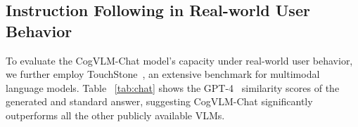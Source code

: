\subsection{Instruction Following in Real-world User Behavior}
To evaluate the CogVLM-Chat model’s capacity under real-world user behavior, we further employ TouchStone~\citep{bai2023touchstone}, an extensive benchmark for multimodal language models. 
Table ~\ref{tab:chat} shows the GPT-4~\citep{openai2023} similarity scores of the generated and standard answer, suggesting CogVLM-Chat significantly outperforms all the other publicly available VLMs.







    \begin{table}[ht]
  \caption{Evaluation results on TouchStone in English.}
  \renewcommand{\arraystretch}{1.15}
\end{table}
 






